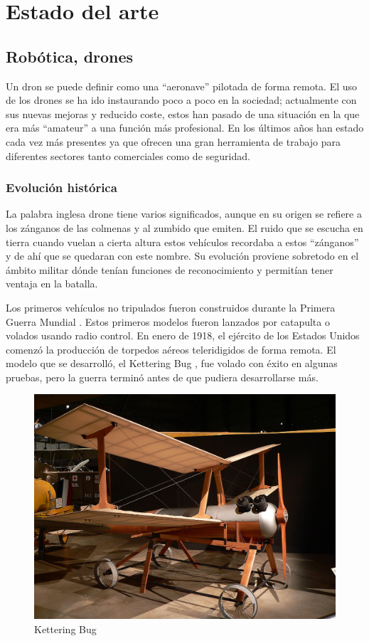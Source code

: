 \chapter{Estado del arte}\label{sec:Estado_arte}
\section{Robótica, drones}
Un dron se puede definir como una “aeronave” pilotada de forma remota. El uso de los drones se ha ido instaurando poco a poco en la sociedad; actualmente con sus nuevas mejoras y reducido coste, estos han pasado de una situación en la que era más “amateur” a una función más profesional. En los últimos años han estado cada vez más presentes ya que ofrecen una gran herramienta de trabajo para diferentes sectores tanto comerciales como de seguridad. \newline 

\subsection{Evolución histórica}
La palabra inglesa drone tiene varios significados, aunque en su origen se refiere a los zánganos de las colmenas y al zumbido que emiten. El ruido que se escucha en tierra cuando vuelan a cierta altura estos vehículos recordaba a estos “zánganos” y de ahí que se quedaran con este nombre. Su evolución  proviene sobretodo en el ámbito militar dónde tenían funciones de reconocimiento y permitían tener ventaja en la batalla.\newline 

Los primeros vehículos no tripulados fueron construidos durante la Primera Guerra Mundial . Estos primeros modelos fueron lanzados por catapulta o volados usando radio control. En enero de 1918, el ejército de los Estados Unidos comenzó la producción de torpedos aéreos teleridigidos de forma remota. El modelo que se desarrolló, el Kettering Bug , fue volado con éxito en algunas pruebas, pero la guerra terminó antes de que pudiera desarrollarse más. \newline

\begin{figure}[H]
	\center
	\includegraphics[scale=0.5]{imagenes/EstadodelArte/ketbug.png}
	\caption{Kettering Bug}
	\label{fig:Kettering Bug}
\end{figure}
 

